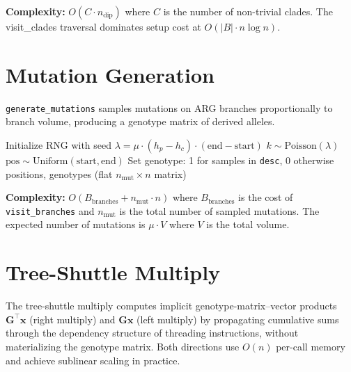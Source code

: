 \documentclass[11pt]{article}
\begin{document}
\textbf{Complexity:}  $O(C \cdot n_\text{dip})$ where $C$ is the number of
non-trivial clades.  The visit\_clades traversal dominates setup cost at
$O(|B| \cdot n \log n)$.

\section{Mutation Generation}

\texttt{generate\_mutations} samples mutations on ARG branches
proportionally to branch volume, producing a genotype matrix of
derived alleles.

\begin{algorithm}[h]
\caption{\texttt{generate\_mutations}: Poisson mutation sampling}
\begin{algorithmic}[1]
\State Initialize RNG with seed
    \State $\lambda = \mu \cdot (h_p - h_c) \cdot (\text{end} - \text{start})$
    \State $k \sim \text{Poisson}(\lambda)$
        \State $\text{pos} \sim \text{Uniform}(\text{start}, \text{end})$
        \State Set genotype: 1 for samples in \texttt{desc}, 0 otherwise
    \EndFor
\EndFor
\State \Return positions, genotypes (flat $n_\text{mut} \times n$ matrix)
\end{algorithmic}
\end{algorithm}

\textbf{Complexity:}  $O(B_\text{branches} + n_\text{mut} \cdot n)$ where
$B_\text{branches}$ is the cost of \texttt{visit\_branches} and
$n_\text{mut}$ is the total number of sampled mutations.  The expected
number of mutations is $\mu \cdot V$ where $V$ is the total volume.

\section{Tree-Shuttle Multiply}

The tree-shuttle multiply computes implicit genotype-matrix--vector products
$\mathbf{G}^\top \mathbf{x}$ (right multiply) and $\mathbf{G}\mathbf{x}$
(left multiply) by propagating cumulative sums through the dependency
structure of threading instructions, without materializing the genotype
matrix.  Both directions use $O(n)$ per-call memory and achieve sublinear
scaling in practice.
\end{document}
